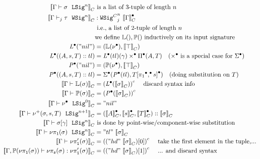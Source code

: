 \begin{align*}
  \denotesC{\goodSig{\Gm}{\lsig}{n}} & \text{ is a list of 3-tuple of length $n$  } \\
  \denotesC{\goodWSigU{j}{\Gm}{\wsig}{n}} &: \GMWSig{j}{\denotesCC{\Gm}}{n} \\ 
    &\text{ i.e., a list of 2-tuple of length $n$ } \\
  & \text{we define }\TyLkg{}, \TyTkg{} \text{ inductively on its input signature} \\ 
  \Glued{\mathit{L}}("nil") &= ( \TyLkg{\LSigEmp} , \denotesC{\top} ) \\
  \Glued{\mathit{L}}((A,s,T) :: tl) &= {\Glued{\mathit{L}}(tl)}(\gm) \times^\bullet \GluedPi{A}{T} \quad \text{($\times^\bullet$ is a special case for $\Glued{\Sigma}$)}  \\
  \Glued{\mathit{P}}("nil") &= ( \TyTkg{\LSigEmp} , \denotesC{\top} )\\
  \Glued{\mathit{P}}((A,s,T) :: tl) &= \Glued{\Sigma}(\Glued{\mathit{P}}(tl), \Gsub{T}{\GSubstExt{\Glued{\pi_1}}{s}}) \quad \text{(doing substitution on $T$)} \\
  \denotesC{\goodType{\Gm}{\TyLkg{\lsig}}{}} &= \Gmodel{\Glued{\mathit{L}}(\denotesC{\lsig})} \quad \text{ discard syntax info} \\
  \denotesC{\goodType{\Gm}{\TyTkg{\lsig}}{}} &= \Gmodel{\Glued{\mathit{P}}(\denotesC{\lsig})} \\
  \denotesC{\goodSig{\Gm}{\LSigEmp}{0}} &= "nil"\\ 
  \denotesC{\goodSig{\Gm}{\LSigAdd{\lsig}{s}{T}}{n+1}} &= (\denotesCC{A}, \denotesCC{s}, \denotesCC{T})::\denotesC{\lsig}\\ 
  \denotesC{\goodSig{\Gm}{\sub{\lsig}{\gm}}{n}} & \text{ is done by point-wise/component-wise substitution} \\
  \denotesC{\goodSig{\Gm}{\lsigproj{1}{\lsig}}{n}} &= "tl"~\denotesC{\lsig}\\ 
  \denotesC{\goodType{\Gm}{\lsigprojT{\lsig}}{}} &= \Gmodel{("hd"~\denotesC{\lsig})[0]} \quad \text{ take the first element in the tuple,...}\\ 
  \denotesC{\goodTerm{\Gm, \TyTkg{\lsigproj{1}{\lsig}}}{\lsigproj{s}{\lsig}}{\lsigprojT{\lsig}}} &= \Gmodel{("hd"~\denotesC{\lsig})[1]} \quad \text{  ... and discard syntax}\\ 

\end{align*}
